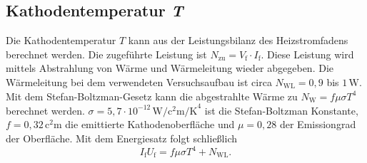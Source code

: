 \subsection{Kathodentemperatur \textit{T}}

Die Kathodentemperatur $T$ kann aus der Leistungsbilanz des Heizstromfadens berechnet werden.
Die zugeführte Leistung ist $N_{\mathrm{zu}} = V_{\mathrm{f}} \cdot I_{\mathrm{f}}$. Diese 
Leistung wird mittels Abstrahlung von Wärme und Wärmeleitung wieder abgegeben. Die Wärmeleitung
bei dem verwendeten Versuchsaufbau ist circa $N_{\mathrm{WL}} = 0,9$ bis $1 \, \si{\watt}$.
Mit dem Stefan-Boltzman-Gesetz kann die abgestrahlte Wärme zu $N_{\mathrm{W}} = f \mu \sigma T^4$
berechnet werden. $\sigma = 5,7 \cdot 10^{-12} \, \si{\watt\per\square\centi\meter\per\kelvin}^4$ ist
die Stefan-Boltzman Konstante, $f = 0,32 \, \si{\square\centi\meter}$ die emittierte
Kathodenoberfläche und $\mu = 0,28$ der Emissiongrad der Oberfläche.
Mit dem Energiesatz folgt schließlich
\begin{equation}
    \label{eqn:Temp}
    I_{\mathrm{f}} U_{\mathrm{f}} =  f \mu \sigma T^4 + N_{\mathrm{WL}}.
\end{equation}